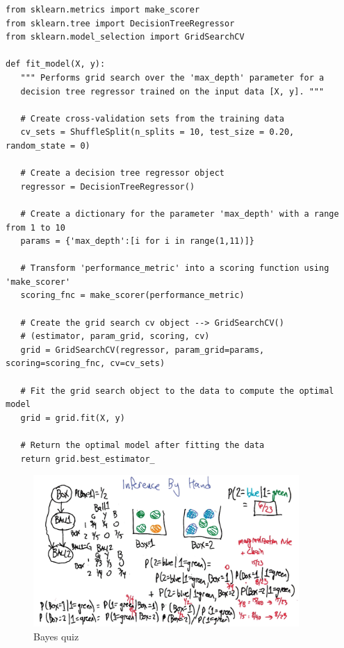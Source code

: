 \documentclass[11pt]{article}
\begin{document}
\begin{lstlisting}
from sklearn.metrics import make_scorer
from sklearn.tree import DecisionTreeRegressor
from sklearn.model_selection import GridSearchCV

def fit_model(X, y):
   """ Performs grid search over the 'max_depth' parameter for a 
   decision tree regressor trained on the input data [X, y]. """

   # Create cross-validation sets from the training data
   cv_sets = ShuffleSplit(n_splits = 10, test_size = 0.20, random_state = 0)

   # Create a decision tree regressor object
   regressor = DecisionTreeRegressor()

   # Create a dictionary for the parameter 'max_depth' with a range from 1 to 10
   params = {'max_depth':[i for i in range(1,11)]}

   # Transform 'performance_metric' into a scoring function using 'make_scorer' 
   scoring_fnc = make_scorer(performance_metric)

   # Create the grid search cv object --> GridSearchCV()
   # (estimator, param_grid, scoring, cv) 
   grid = GridSearchCV(regressor, param_grid=params, scoring=scoring_fnc, cv=cv_sets)

   # Fit the grid search object to the data to compute the optimal model
   grid = grid.fit(X, y)

   # Return the optimal model after fitting the data
   return grid.best_estimator_
\end{lstlisting}


\begin{figure}[htbp] 
	\centering
	\includegraphics[width=0.9\textwidth]{pics/quiz_bayes}
	\caption{Bayes quiz} 
	\label{bayes_quiz}
\end{figure}
\end{document}
